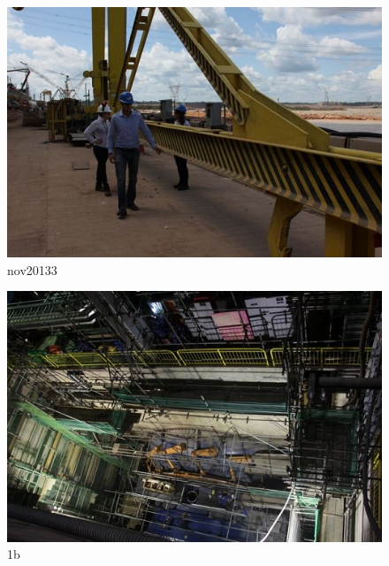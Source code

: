 \begin{figure}[h!]
  \centering
  \includegraphics[width=1\linewidth]{Fotos/Novembro2013/3.jpg}
  \caption{nov20133}
  \label{nov20133}
\end{figure}

\begin{figure}[h!]
  \centering
  \includegraphics[width=1\linewidth]{Fotos/Novembro2013/4.jpg}
  \caption{1b}
  \label{nov20134}
\end{figure}